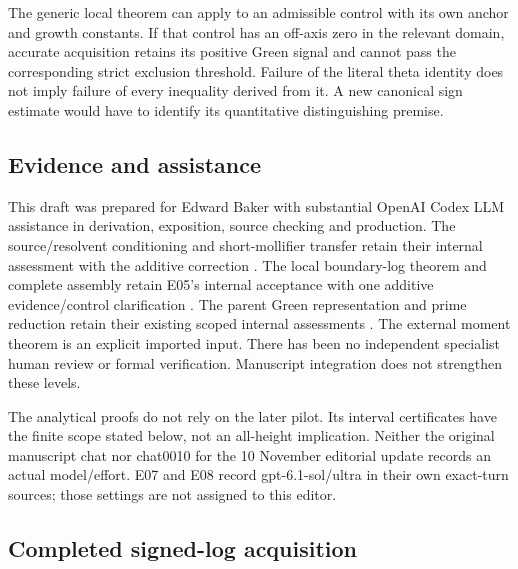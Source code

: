The generic local theorem can apply to an admissible control with its
own anchor and growth constants. If that control has an off-axis zero
in the relevant domain, accurate acquisition retains its positive
Green signal and cannot pass the corresponding strict exclusion
threshold. Failure of the literal theta identity does not imply
failure of every inequality derived from it. A new canonical sign
estimate would have to identify its quantitative distinguishing
premise.

\subsection{Evidence and assistance}

This draft was prepared for Edward Baker with substantial OpenAI Codex
LLM assistance in derivation, exposition, source checking and production.
The source/resolvent conditioning and short-mollifier transfer retain
their internal assessment with the additive correction
\cite{OGCorrection,OGAssessment}. The local boundary-log theorem and
complete assembly retain E05's internal acceptance with one additive
evidence/control clarification
\cite{OGBoundaryLog,OGAssemblyProof,OGAssemblyAssessment}.
The parent Green representation and prime reduction retain their
existing scoped internal assessments
\cite{LocalizedMetricsAssessment,PrimeBaselineAssessment}.
The external moment theorem is an explicit imported input.
There has been no independent specialist human review or formal
verification. Manuscript integration does not strengthen these levels.

The analytical proofs do not rely on the later pilot. Its interval
certificates have the finite scope stated below, not an all-height
implication. Neither the original manuscript chat nor chat0010 for
the 10 November editorial update records an actual model/effort.
E07 and E08 record gpt-6.1-sol/ultra in their own exact-turn sources;
those settings are not assigned to this editor.

\subsection{Completed signed-log acquisition}

